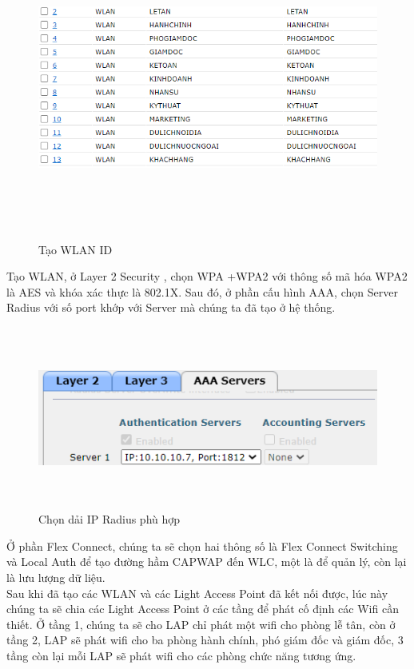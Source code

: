 \documentclass[a4paper, 12pt]{article}
\begin{document}
\begin{figure}[H]
    \centering
    \includegraphics[width=16cm, height=10cm]{img/4.6d.png}
    \caption{Tạo WLAN ID }
    \label{hinh46d}
\end{figure}
\hspace*{1cm}Tạo WLAN, ở Layer 2 Security , chọn WPA +WPA2 với thông số mã hóa WPA2 là AES và khóa xác thực là 802.1X. Sau đó, ở phần cấu hình AAA, chọn Server Radius với số port khớp với Server mà chúng ta đã tạo ở hệ thống.\\
\begin{figure}[H]
    \centering
    \includegraphics[width=12cm, height=6cm]{img/4.6e.png}
    \caption{Chọn dải IP Radius phù hợp}
    \label{hinh46e}
\end{figure}
\hspace*{1cm}Ở phần Flex Connect, chúng ta sẽ chọn hai thông số là Flex Connect Switching và Local Auth để tạo đường hầm CAPWAP đến WLC, một là để quản lý, còn lại là lưu lượng dữ liệu.\\
\hspace*{1cm}Sau khi đã tạo các WLAN và các Light Access Point đã kết nối được, lúc này chúng ta sẽ chia các Light Access Point ở các tầng để phát cố định các Wifi cần thiết. Ở tầng 1, chúng ta sẽ cho LAP chỉ phát một wifi cho phòng lễ tân, còn ở tầng 2, LAP sẽ phát wifi cho ba phòng hành chính, phó giám đốc và giám đốc, 3 tầng còn lại mỗi LAP sẽ phát wifi cho các phòng chức năng tương ứng.\\
\end{document}
